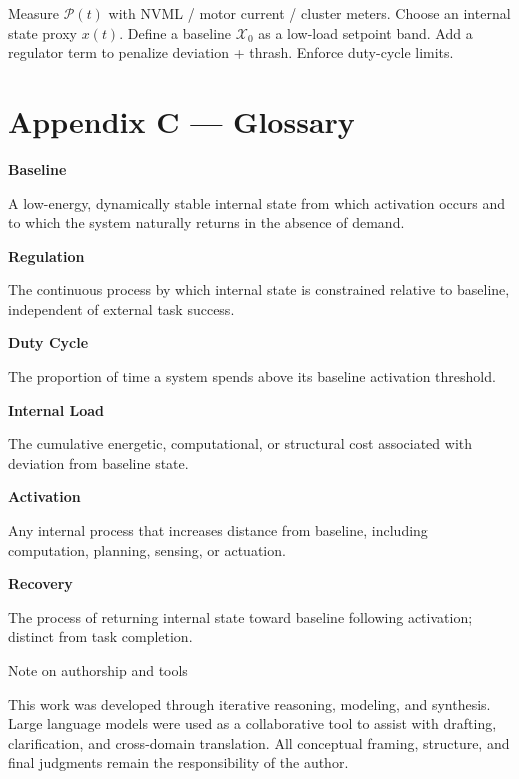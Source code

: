 \documentclass[11pt]{article}
\begin{document}
Measure \(\mathcal{P}(t)\) with NVML / motor current / cluster meters. Choose an internal state proxy \(x(t)\). Define a baseline \(\mathcal{X}_0\) as a low-load setpoint band. Add a regulator term to penalize deviation + thrash. Enforce duty-cycle limits.

\section{Appendix C — Glossary}
\textbf{Baseline}\par
A low-energy, dynamically stable internal state from which activation occurs and to which the system naturally returns in the absence of demand.\par\medskip

\textbf{Regulation}\par
The continuous process by which internal state is constrained relative to baseline, independent of external task success.\par\medskip

\pagebreak
\textbf{Duty Cycle}\par
The proportion of time a system spends above its baseline activation threshold.\par\medskip

\textbf{Internal Load}\par
The cumulative energetic, computational, or structural cost associated with deviation from baseline state.\par\medskip

\textbf{Activation}\par
Any internal process that increases distance from baseline, including computation, planning, sensing, or actuation.\par\medskip

\textbf{Recovery}\par
The process of returning internal state toward baseline following activation; distinct from task completion.\par\medskip

\clearpage
\thispagestyle{empty}
\begin{center}
{\Large Note on authorship and tools}
\end{center}
\vspace{0.8cm}
This work was developed through iterative reasoning, modeling, and synthesis. Large language models were used as a collaborative tool to assist with drafting, clarification, and cross-domain translation. All conceptual framing, structure, and final judgments remain the responsibility of the author.
\end{document}
